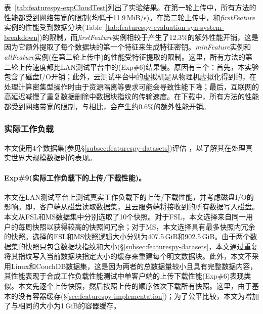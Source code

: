 表~\ref{tab:featurespy-expCloudTest}列出了实验结果。在第一轮上传中，所有方法的性能都受到网络带宽的限制(均低于11.9\,MiB/s)。在第二轮上传中，\sysnameS 和\textit{firstFeature}实例的性能受到数据分块(Table~\ref{tab:featurespy-evaluation-syn-system-breakdown})的限制，而\textit{firstFeature}实例相较于\sysnameS 产生了12.3\%的额外性能开销，这是因为它额外提取了每个数据块的第一个特征来生成特征密钥。\textit{minFeature}实例和\textit{allFeature}实例(在第二轮上传中)的性能受特征提取的限制。这里，所有方法的第二轮上传速度都比LAN测试平台中的(Exp\#6)结果慢。原因有三个：首先，本实验包含了磁盘I/O开销；此外，云测试平台中的虚拟机是从物理机虚拟化得到的，在处理计算密集型操作时由于资源隔离等要求可能会导致性能下降；最后，互联网的高延迟减慢了重复数据删除中数据块指纹的传输速度。在下载中，所有方法的性能都受到网络带宽的限制，与\sysnameS 相比，\prototype 会产生约0.6\%的额外性能开销。

\subsubsection{实际工作负载}
\label{subsubsec:featurespy-real}
本文使用4个数据集(参见\S\ref{subsec:featurespy-datasets})评估 \prototype，以了解其在处理真实世界大规模数据时的表现。

\paragraph*{Exp\#9(实际工作负载下的上传/下载性能)。}本文在LAN测试平台上测试真实工作负载下的上传/下载性能，并考虑磁盘I/O的影响。即，客户端从磁盘读取数据集，且云服务端将接收到的所有数据写入磁盘。本文从FSL和MS数据集中分别选取了10个快照。对于FSL，本文选择来自同一用户的每周快照以获得较高的快照间冗余；对于MS，本文选择具有最多快照内冗余的快照。选择的FSL和MS快照逻辑大小分别为407.5\,GiB和902.5\,GiB。由于两个数据集的快照只包含数据块指纹和大小(\S\ref{subsec:featurespy-datasets}，本文通过重复将其指纹写入当前数据块指定大小的缓存来重建每个明文数据块。此外，本文不采用Linux和CouchDB数据集，这是因为两者的总数据量较小且具有完整数据内容，其性能表现于合成工作负载性能测试中单客户端的上传下载性能(Exp\#6)表现类似。本文先逐个上传快照，然后按照上传的顺序依次下载所有快照。这里，由于基本的\sysnameS 没有容器缓存(\S\ref{sec:featurespy-implementation})；为了公平比较，本文为\sysnameS 增加了与\prototype 相同的大小为1\,GiB的容器缓存。


